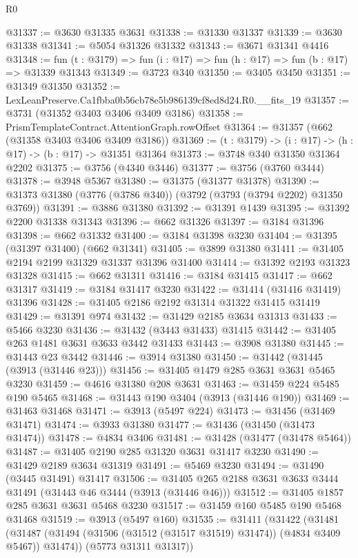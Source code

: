\begin{lexlean}{R0}
\begin{coremodule}
@31337 := @3630 @31335 @3631
@31338 := @31330 @31337
@31339 := @3630 @31338
@31341 := @5054 @31326 @31332
@31343 := @3671 @31341 @4416
@31348 := fun (t : @3179) => fun (i : @17) => fun (h : @17) => fun (b : @17) => @31339 @31343
@31349 := @3723 @340
@31350 := @3405 @3450
@31351 := @31349 @31350
@31352 := LexLeanPreserve.Ca1fbba0b56cb78e5b986139cf8ed8d24.R0.__fits_19
@31357 := @3731 (@31352 @3403 @3406 @3409 @3186)
@31358 := PrismTemplateContract.AttentionGraph.rowOffset
@31364 := @31357 (@662 (@31358 @3403 @3406 @3409 @3186))
@31369 := (t : @3179) -> (i : @17) -> (h : @17) -> (b : @17) -> @31351 @31364
@31373 := @3748 @340 @31350 @31364 @2202
@31375 := @3756 (@4340 @3446)
@31377 := @3756 (@3760 @3444)
@31378 := @3948 @5367
@31380 := @31375 (@31377 @31378)
@31390 := @31373 @31380 (@3776 (@3786 @340)) (@3792 (@3793 (@3794 @2202) @31350 @3769))
@31391 := @3886 @31380
@31392 := @31391 @1439
@31395 := @31392 @2200 @31338 @31343
@31396 := @662 @31326
@31397 := @3184 @31396
@31398 := @662 @31332
@31400 := @3184 @31398 @3230
@31404 := @31395 (@31397 @31400) (@662 @31341)
@31405 := @3899 @31380
@31411 := @31405 @2194 @2199 @31329 @31337 @31396 @31400
@31414 := @31392 @2193 @31323 @31328
@31415 := @662 @31311
@31416 := @3184 @31415
@31417 := @662 @31317
@31419 := @3184 @31417 @3230
@31422 := @31414 (@31416 @31419) @31396
@31428 := @31405 @2186 @2192 @31314 @31322 @31415 @31419
@31429 := @31391 @974
@31432 := @31429 @2185 @3634 @31313
@31433 := @5466 @3230
@31436 := @31432 (@3443 @31433) @31415
@31442 := @31405 @263 @1481 @3631 @3633 @3442 @31433
@31443 := @3908 @31380
@31445 := @31443 @23 @3442
@31446 := @3914 @31380
@31450 := @31442 (@31445 (@3913 (@31446 @23)))
@31456 := @31405 @1479 @285 @3631 @3631 @5465 @3230
@31459 := @4616 @31380 @208 @3631
@31463 := @31459 @224 @5485 @190 @5465
@31468 := @31443 @190 @3404 (@3913 (@31446 @190))
@31469 := @31463 @31468
@31471 := @3913 (@5497 @224)
@31473 := @31456 (@31469 @31471)
@31474 := @3933 @31380
@31477 := @31436 (@31450 (@31473 @31474))
@31478 := @4834 @3406
@31481 := @31428 (@31477 (@31478 @5464))
@31487 := @31405 @2190 @285 @31320 @3631 @31417 @3230
@31490 := @31429 @2189 @3634 @31319
@31491 := @5469 @3230
@31494 := @31490 (@3445 @31491) @31417
@31506 := @31405 @265 @2188 @3631 @3633 @3444 @31491 (@31443 @46 @3444 (@3913 (@31446 @46)))
@31512 := @31405 @1857 @285 @3631 @3631 @5468 @3230
@31517 := @31459 @160 @5485 @190 @5468 @31468
@31519 := @3913 (@5497 @160)
@31535 := @31411
    (@31422
      (@31481 (@31487 (@31494 (@31506 (@31512 (@31517 @31519) @31474)) (@4834 @3409 @5467)) @31474))
      (@5773 @31311 @31317))

\end{coremodule}
\end{lexlean}
